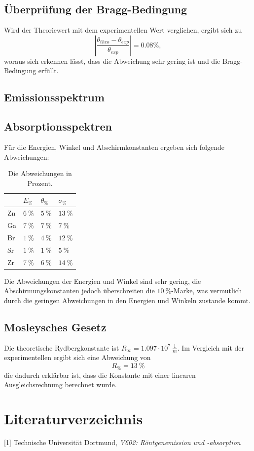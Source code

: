 \documentclass[a4paper]{scrartcl}
\begin{document}
\subsection{Überprüfung der Bragg-Bedingung}
Wird der Theoriewert mit dem experimentellen Wert verglichen, ergibt sich zu
\begin{equation*}
  |\frac{\theta_{theo}-\theta_{exp}}{\theta_{exp}}|=0.08\%,
\end{equation*}
woraus sich erkennen lässt, dass die Abweichung sehr gering ist und die Bragg-Bedingung erfüllt.

\subsection{Emissionsspektrum}

\subsection{Absorptionsspektren}
Für die Energien, Winkel und Abschirmkonstanten ergeben sich folgende Abweichungen:
\begin{table}[H]
  \centering
  \begin{tabular}{l|l|l|l}
  & $E_{\%}$ & $\theta_{\%}$ & $\sigma_{\%}$\\ \hline
  Zn & $6\ \%$ & $5\ \%$ & $13\ \%$\\ \hline
  Ga & $7\ \%$ & $7\ \%$ & $7\ \%$\\ \hline
  Br & $1\ \%$ & $4\ \%$ & $12\ \%$\\ \hline
  Sr & $1\ \%$ & $1\ \%$ & $5\ \%$\\ \hline
  Zr & $7\ \%$ & $6\ \%$ & $14\ \%$\\ \hline
  \end{tabular}
  \caption{Die Abweichungen in Prozent.}
\end{table}
Die Abweichungen der Energien und Winkel sind sehr gering, die Abschirmungskonstanten jedoch überschreiten die $10\ \%$-Marke, was vermutlich durch die geringen Abweichungen in den Energien und Winkeln zustande kommt. 

\subsection{Mosleysches Gesetz}
Die theoretische Rydbergkonstante ist $R_{\infty}=1.097\cdot 10^{7}\ \frac{1}{m}$. Im Vergleich mit der experimentellen ergibt sich eine Abweichung von 
\begin{equation*}
  R_{\%}=13\ \%
\end{equation*}
die dadurch erklärbar ist, dass die Konstante mit einer linearen Ausgleichsrechnung berechnet wurde. 

\section{Literaturverzeichnis}
[1] Technische Universität Dortmund, \textit{V602: Röntgenemission und -absorption}
\end{document}
